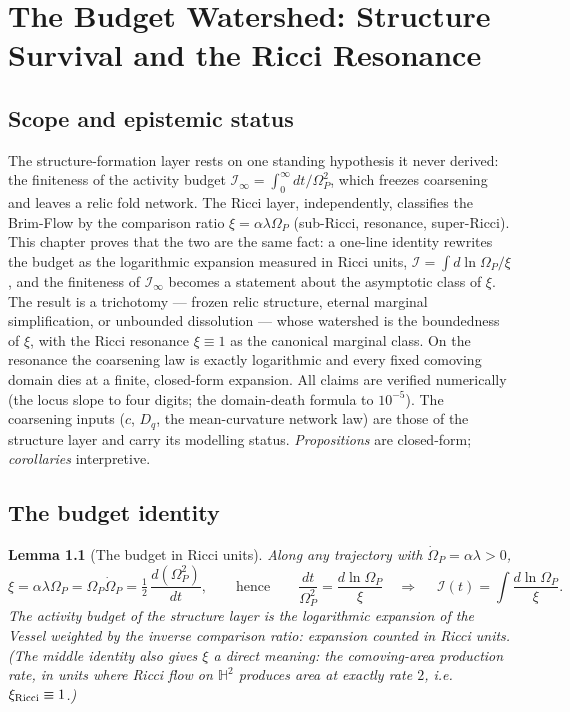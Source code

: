 \documentclass[11pt,a4paper,oneside]{book}
\newcommand{\Op}{\Omega_P}
\newcommand{\Dq}{D_q}
\newcommand{\Ib}{\mathcal I}
\theoremstyle{plain}
\newtheorem{lemma}{Lemma}[chapter]
\theoremstyle{definition}
\theoremstyle{remark}
\begin{document}
\chapter{The Budget Watershed: Structure Survival and the Ricci Resonance}

\section*{Scope and epistemic status}
The structure-formation layer rests on one standing hypothesis it never derived: the finiteness of the
activity budget $\Ib_\infty=\int_0^\infty dt/\Op^2$, which freezes coarsening and leaves a relic fold
network. The Ricci layer, independently, classifies the Brim-Flow by the comparison ratio
$\xi=\alpha\lambda\Op$ (sub-Ricci, resonance, super-Ricci). This chapter proves that the two are the
same fact: a one-line identity rewrites the budget as the logarithmic expansion measured in Ricci
units, $\Ib=\int d\ln\Op/\xi$, and the finiteness of $\Ib_\infty$ becomes a statement about the
asymptotic class of $\xi$. The result is a trichotomy --- frozen relic structure, eternal marginal
simplification, or unbounded dissolution --- whose watershed is the boundedness of $\xi$, with the
Ricci resonance $\xi\equiv1$ as the canonical marginal class. On the resonance the coarsening law is
exactly logarithmic and every fixed comoving domain dies at a finite, closed-form expansion. All
claims are verified numerically (the locus slope to four digits; the domain-death formula to
$10^{-5}$). The coarsening inputs ($c$, $\Dq$, the mean-curvature network law) are those of the
structure layer and carry its modelling status. \emph{Propositions} are closed-form;
\emph{corollaries} interpretive.

\section{The budget identity}

\begin{lemma}[The budget in Ricci units]\label{resonancewatershed:lem:identity}
Along any trajectory with $\dot\Op=\alpha\lambda>0$,
\begin{equation}
\xi=\alpha\lambda\Op=\Op\dot\Op=\tfrac12\,\frac{d(\Op^2)}{dt},
\qquad\text{hence}\qquad
\frac{dt}{\Op^{2}}=\frac{d\ln\Op}{\xi}
\quad\Longrightarrow\quad
\boxed{\;\Ib(t)=\int\frac{d\ln\Op}{\xi}.\;}
\end{equation}
The activity budget of the structure layer is the logarithmic expansion of the Vessel weighted by the
inverse comparison ratio: \emph{expansion counted in Ricci units}. (The middle identity also gives
$\xi$ a direct meaning: the comoving-area production rate, in units where Ricci flow on
$\mathbb H^2$ produces area at exactly rate $2$, i.e.\ $\xi_{\rm Ricci}\equiv1$.)
\end{lemma}
\end{document}
